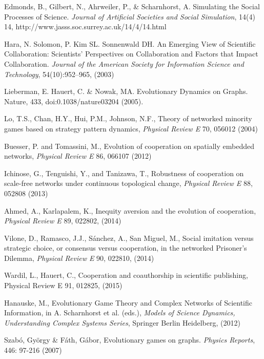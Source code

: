 \documentclass[11pt]{article}
\begin{document}
\begin{thebibliography}{100}
 Edmonds, B., Gilbert, N., Ahrweiler, P., \&
  Scharnhorst, A. Simulating the Social Processes of Science.
  \textit{Journal of Artificial Societies and Social Simulation},
  14(4) 14,  http://www.jasss.soc.surrey.ac.uk/14/4/14.html
  
 Hara, N. Solomon, P. Kim SL. Sonnenwald DH. An Emerging View of Scientific Collaboration:
  Scientists’ Perspectives on Collaboration and Factors that Impact Collaboration. \textit{Journal of the American
    Society for Information Science and Technology}, 54(10):952–965, (2003) 

 Lieberman, E. Hauert, C. \& Nowak,
  MA. Evolutionary Dynamics on Graphs. Nature, 433, doi:0.1038/nature03204 (2005).

  
 Lo, T.S., Chan, H.Y., Hui, P.M., Johnson, N.F.,
  Theory of networked minority games based on strategy pattern
  dynamics, \textit{Physical Review E} 70, 056012 (2004) 

 Buesser, P. and Tomassini, M., Evolution of
  cooperation on spatially embedded networks, \textit{Physical Review E} 86,
  066107 (2012)  

 Ichinose, G., Tenguishi, Y., and Tanizawa, T.,
  Robustness of cooperation on scale-free networks under continuous
  topological change, \textit{Physical Review E} 88, 052808 (2013) 

 Ahmed, A., Karlapalem, K., Inequity aversion and
  the evolution of cooperation, \textit{Physical Review E} 89, 022802, (2014)

 Vilone, D., Ramasco, J.J., S\'anchez, A., San
  Miguel, M., Social imitation versus strategic choice, or consensus
  versus cooperation, in the networked Prisoner’s Dilemma,
  \textit{Physical Review E} 90, 022810, (2014) 
 
 Wardil, L., Hauert, C., Cooperation and coauthorship in
  scientific publishing, Physical Review E 91, 012825, (2015)
 
  Hanauske, M., Evolutionary Game Theory and Complex Networks of Scientific Information, in A. Scharnhorst et al. (eds.), \textit{Models of Science Dynamics, Understanding Complex Systems Series}, Springer Berlin Heidelberg, (2012)
  
 Szab\'o, Gy\"{o}rgy \& F\'ath, G\'abor,
  Evolutionary games on graphs. \textit{Physics Reports}, 446: 97-216
  (2007) 


\end{thebibliography}
\end{document}
